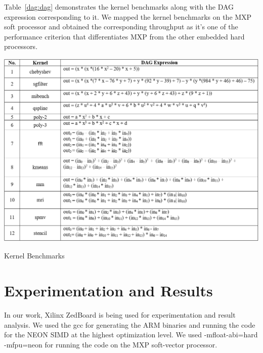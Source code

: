Table~\ref{dag:dag} demonstrates the kernel benchmarks along with the DAG expression corresponding to it. We mapped the kernel benchmarks on the MXP soft processor and obtained the corresponding throughput as it's one of the performance criterion that differentiates MXP from the other embedded hard processors.

\begin{table}
	\centering
	\includegraphics[width=1\textwidth]{images/dag.png}
	\caption{Kernel Benchmarks}
	\label{dag:dag}
\end{table}

\section{Experimentation and Results}

In our work, Xilinx ZedBoard is being used for experimentation and result analysis. We used the gcc for generating the ARM binaries and running the code for the NEON SIMD at the highest optimization level. We used -mfloat-abi=hard -mfpu=neon for running the code on the MXP soft-vector processor.

